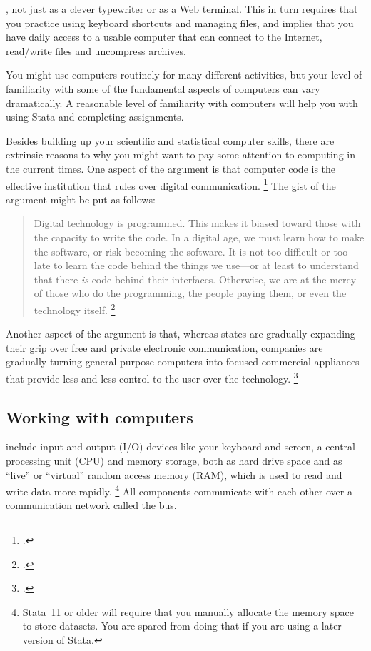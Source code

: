 %
, not just as a clever typewriter or as a Web terminal. This in turn requires that you practice using keyboard shortcuts and managing files, and implies that you have daily access to a usable computer that can connect to the Internet, read/write \PDF files and uncompress \ZIP archives.%

You might use computers routinely for many different activities, but your level of familiarity with some of the fundamental aspects of computers can vary dramatically. A reasonable level of familiarity with computers will help you with using Stata and completing assignments.%

Besides building up your scientific and statistical computer skills, there are extrinsic reasons to why you might want to pay some attention to computing in the current times. One aspect of the argument is that computer code is the effective institution that rules over digital communication.%
  \footcite{Lessig:2006} %
  The gist of the argument might be put as follows: %

\begin{quote}%
Digital technology is programmed. This makes it biased toward those with the capacity to write the code. In a digital age, we must learn how to make the software, or risk becoming the software. It is not too difficult or too late to learn the code behind the things we use—or at least to understand that there \emph{is} code behind their interfaces. Otherwise, we are at the mercy of those who do the programming, the people paying them, or even the technology itself.%
\footcite[p.~128]{Rushkoff:2010}%
\end{quote}

Another aspect of the argument is that, whereas states are gradually expanding their grip over free and private electronic communication, companies are gradually turning general purpose computers into focused commercial appliances that provide less and less control to the user over the technology.%
  \footcite{Doctorow:2011} %

%
\subsection{Working with computers}%
  \label{ch:computers}%

%
 include input and output (I/O) devices like your keyboard and screen, a central processing unit (CPU) and memory storage, both as hard drive space and as ``live'' or ``virtual'' random access memory (RAM), which is used to read and write data more rapidly.%
  \footnote{Stata~11 or older will require that you manually allocate the memory space to store datasets. You are spared from doing that if you are using a later version of Stata.} %
  All components communicate with each other over a communication network called the bus.%
%

